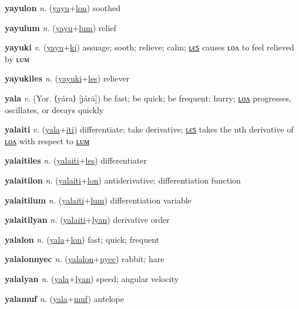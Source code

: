 \textbf{\hypertarget{yayulon}{yayulon}} \textit{n.} (\hyperlink{yayu}{yayu}+\allowbreak \hyperlink{lon}{lon})
soothed

\textbf{\hypertarget{yayulum}{yayulum}} \textit{n.} (\hyperlink{yayu}{yayu}+\allowbreak \hyperlink{lum}{lum})
relief

\textbf{\hypertarget{yayuki}{yayuki}} \textit{v.} (\hyperlink{yayu}{yayu}+\allowbreak \hyperlink{ki}{ki})
assuage; sooth; relieve; calm; \hyperlink{yayukiles}{ʟєꜱ} causes ʟᴏᴧ to feel relieved by ʟᴜᴍ

\textbf{\hypertarget{yayukiles}{yayukiles}} \textit{n.} (\hyperlink{yayuki}{yayuki}+\allowbreak \hyperlink{les}{les})
reliever

\textbf{\hypertarget{yala}{yala}} \textit{v.} (Yor. ⟨yára⟩ [járā])
be fast; be quick; be frequent; hurry; \hyperlink{yalalon}{ʟᴏᴧ} progresses, oscillates, or decays quickly

\textbf{\hypertarget{yalaiti}{yalaiti}} \textit{v.} (\hyperlink{yala}{yala}+\allowbreak \hyperlink{iti}{iti})
differentiate; take derivative; \hyperlink{yalaitiles}{ʟєꜱ} takes the nth derivative of \hyperlink{yalaitilon}{ʟᴏᴧ} with respect to \hyperlink{yalaitilum}{ʟᴜᴍ}

\textbf{\hypertarget{yalaitiles}{yalaitiles}} \textit{n.} (\hyperlink{yalaiti}{yalaiti}+\allowbreak \hyperlink{les}{les})
differentiater

\textbf{\hypertarget{yalaitilon}{yalaitilon}} \textit{n.} (\hyperlink{yalaiti}{yalaiti}+\allowbreak \hyperlink{lon}{lon})
antiderivative; differentiation function

\textbf{\hypertarget{yalaitilum}{yalaitilum}} \textit{n.} (\hyperlink{yalaiti}{yalaiti}+\allowbreak \hyperlink{lum}{lum})
differentiation variable

\textbf{\hypertarget{yalaitilyan}{yalaitilyan}} \textit{n.} (\hyperlink{yalaiti}{yalaiti}+\allowbreak \hyperlink{lyan}{lyan})
derivative order

\textbf{\hypertarget{yalalon}{yalalon}} \textit{n.} (\hyperlink{yala}{yala}+\allowbreak \hyperlink{lon}{lon})
fast; quick; frequent

\textbf{\hypertarget{yalalonnyec}{yalalonnyec}} \textit{n.} (\hyperlink{yalalon}{yalalon}+\allowbreak \hyperlink{nyec}{nyec})
rabbit; hare

\textbf{\hypertarget{yalalyan}{yalalyan}} \textit{n.} (\hyperlink{yala}{yala}+\allowbreak \hyperlink{lyan}{lyan})
speed; angular velocity

\textbf{\hypertarget{yalamuf}{yalamuf}} \textit{n.} (\hyperlink{yala}{yala}+\allowbreak \hyperlink{muf}{muf})
antelope

